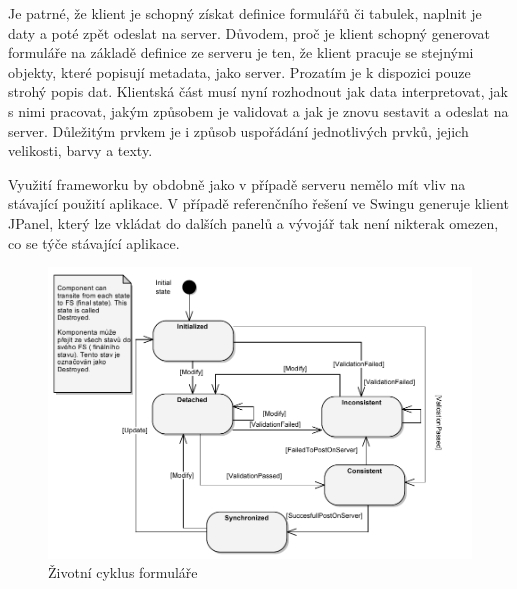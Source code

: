 Je patrné, že klient je schopný získat definice formulářů či tabulek, naplnit je daty a poté zpět odeslat na server. Důvodem, proč je klient schopný generovat formuláře na základě definice ze serveru je ten, že klient pracuje se stejnými objekty, které popisují metadata, jako server. Prozatím je k dispozici pouze strohý popis dat. Klientská část musí nyní rozhodnout jak data interpretovat, jak s nimi pracovat, jakým způsobem je validovat a jak je znovu sestavit a odeslat na server. Důležitým prvkem je i způsob uspořádání jednotlivých prvků, jejich velikosti, barvy a texty.

Využití frameworku by obdobně jako v případě serveru nemělo mít vliv na stávající použití aplikace. V případě referenčního řešení ve Swingu generuje klient JPanel, který lze vkládat do dalších panelů a vývojář tak není nikterak omezen, co se týče stávající aplikace. 

\begin{figure}[h!]
\includegraphics{images/formLifecCycle}
\caption{Životní cyklus formuláře}
\label{img:formLifeCycle}
\end{figure}

